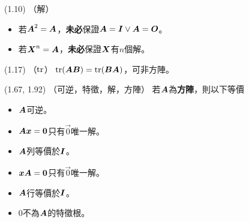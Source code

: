 \item \begin{theorem}{(1.10)} （解）
    \begin{itemize}
        \item 若$\boldsymbol{A}^2 = \boldsymbol{A}$，\textbf{未必}保證$\boldsymbol{A} = \boldsymbol{I} \lor \boldsymbol{A} = \boldsymbol{O}$。
        \item 若$\boldsymbol{X}^n = \boldsymbol{A}$，\textbf{未必}保證$\boldsymbol{X}$有$n$個解。
    \end{itemize}
\end{theorem}

\item \begin{theorem}{(1.17)} （$\operatorname{tr}$）
    $\operatorname{tr}(\boldsymbol{AB}) = \operatorname{tr}(\boldsymbol{BA})$，可非方陣。
\end{theorem}


\item \begin{theorem}{(1.67, 1.92)} （可逆，特徵，解，方陣）
    若$\boldsymbol{A}$為\textbf{方陣}，則以下等價
    \begin{itemize}
        \item $\boldsymbol{A}$可逆。
        \item $\boldsymbol{A}\boldsymbol{x} = \boldsymbol{0}$只有$\vec{0}$唯一解。
        \item $\boldsymbol{A}$列等價於$\boldsymbol{I}$。
        \item $\boldsymbol{x}\boldsymbol{A} = \boldsymbol{0}$只有$\vec{0}$唯一解。
        \item $\boldsymbol{A}$行等價於$\boldsymbol{I}$。
        \item $0$不為$\boldsymbol{A}$的特徵根。
    \end{itemize}
\end{theorem}

